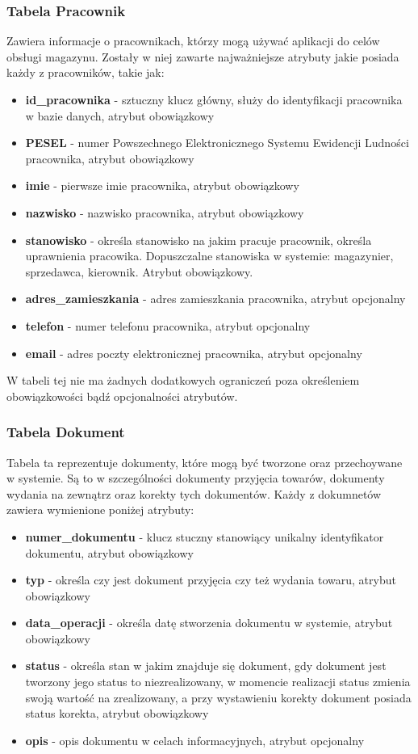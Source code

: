 \subsubsection{Tabela Pracownik}
Zawiera informacje o pracownikach, którzy mogą używać aplikacji do celów obsługi
magazynu. Zostały w niej zawarte najważniejsze atrybuty jakie posiada każdy z
pracowników, takie jak:
\begin{itemize}
  \item \textbf{id\_pracownika} - sztuczny klucz główny, służy do identyfikacji
  pracownika w bazie danych, atrybut obowiązkowy
  \item \textbf{PESEL} - numer Powszechnego Elektronicznego Systemu Ewidencji
  Ludności pracownika, atrybut obowiązkowy
  \item \textbf{imie} - pierwsze imie pracownika, atrybut obowiązkowy
  \item \textbf{nazwisko} - nazwisko pracownika, atrybut obowiązkowy
  \item \textbf{stanowisko} - określa stanowisko na jakim pracuje pracownik,
  określa uprawnienia pracowika. Dopuszczalne stanowiska w systemie: magazynier,
  sprzedawca, kierownik. Atrybut obowiązkowy.
  \item \textbf{adres\_zamieszkania} - adres zamieszkania pracownika, atrybut
  opcjonalny
  \item \textbf{telefon} - numer telefonu pracownika, atrybut opcjonalny
  \item \textbf{email} - adres poczty elektronicznej pracownika, atrybut
  opcjonalny
\end{itemize}

W tabeli tej nie ma żadnych dodatkowych ograniczeń poza określeniem
obowiązkowości bądź opcjonalności atrybutów.

\subsubsection{Tabela Dokument}
Tabela ta reprezentuje dokumenty, które mogą być tworzone oraz przechoywane w
systemie. Są to w szczególności dokumenty przyjęcia towarów, dokumenty wydania
na zewnątrz oraz korekty tych dokumentów. Każdy z dokumnetów zawiera wymienione
poniżej atrybuty:
\begin{itemize}
  \item \textbf{numer\_dokumentu} - klucz stuczny stanowiący unikalny
  identyfikator dokumentu, atrybut obowiązkowy
  \item \textbf{typ} - określa czy jest dokument przyjęcia czy też wydania
  towaru, atrybut obowiązkowy
  \item \textbf{data\_operacji} - określa datę stworzenia dokumentu w systemie,
  atrybut obowiązkowy
  \item \textbf{status} - określa stan w jakim znajduje się dokument, gdy
  dokument jest tworzony jego status to niezrealizowany, w momencie realizacji
  status zmienia swoją wartość na zrealizowany, a przy wystawieniu korekty
  dokument posiada status korekta, atrybut obowiązkowy
  \item \textbf{opis} - opis dokumentu w celach informacyjnych, atrybut
  opcjonalny
\end{itemize}

